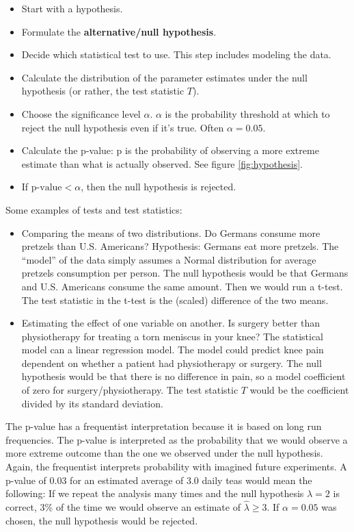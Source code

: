 \documentclass[
  10pt,
]{scrbook}
\providecommand{\tightlist}{%
  \setlength{\itemsep}{0pt}\setlength{\parskip}{0pt}}
\begin{document}
\begin{itemize}
\tightlist
\item
  Start with a hypothesis.
\item
  Formulate the \textbf{alternative/null hypothesis}.
\item
  Decide which statistical test to use. This step includes modeling the data.
\item
  Calculate the distribution of the parameter estimates under the null hypothesis (or rather, the test statistic \(T\)).
\item
  Choose the significance level \(\alpha\). \(\alpha\) is the probability threshold at which to reject the null hypothesis even if it's true. Often \(\alpha = 0.05\).
\item
  Calculate the p-value: p is the probability of observing a more extreme estimate than what is actually observed. See figure \ref{fig:hypothesis}.
\item
  If \(\text{p-value} <\alpha\), then the null hypothesis is rejected.
\end{itemize}

Some examples of tests and test statistics:

\begin{itemize}
\tightlist
\item
  Comparing the means of two distributions. Do Germans consume more pretzels than U.S. Americans? Hypothesis: Germans eat more pretzels. The ``model'' of the data simply assumes a Normal distribution for average pretzels consumption per person. The null hypothesis would be that Germans and U.S. Americans consume the same amount. Then we would run a t-test. The test statistic in the t-test is the (scaled) difference of the two means.
\item
  Estimating the effect of one variable on another. Is surgery better than physiotherapy for treating a torn meniscus in your knee? The statistical model can a linear regression model. The model could predict knee pain dependent on whether a patient had physiotherapy or surgery. The null hypothesis would be that there is no difference in pain, so a model coefficient of zero for surgery/physiotherapy. The test statistic \(T\) would be the coefficient divided by its standard deviation.
\end{itemize}

The p-value has a frequentist interpretation because it is based on long run frequencies.
The p-value is interpreted as the probability that we would observe a more extreme outcome than the one we observed under the null hypothesis.
Again, the frequentist interprets probability with imagined future experiments.
A p-value of 0.03 for an estimated average of 3.0 daily teas would mean the following:
If we repeat the analysis many times and the null hypothesis \(\lambda = 2\) is correct, 3\% of the time we would observe an estimate of \(\hat{\lambda} \geq 3\).
If \(\alpha = 0.05\) was chosen, the null hypothesis would be rejected.
\end{document}
